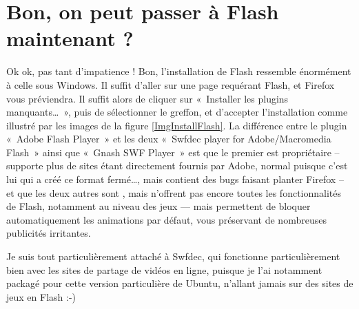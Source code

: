 \section{Bon, on peut passer à Flash maintenant ?}
Ok ok, pas tant d'impatience ! Bon, l'installation de Flash ressemble énormément à celle sous Windows. Il suffit d'aller sur une page requérant Flash, et Firefox vous préviendra. Il suffit alors de cliquer sur «~Installer les plugins manquants\ldots{}~», puis de sélectionner le greffon, et d'accepter l'installation comme illustré par les images de la figure \ref{ImgInstallFlash}. La différence entre le plugin «~Adobe Flash Player~» et les deux «~Swfdec player for Adobe/Macromedia Flash~» ainsi que «~Gnash SWF Player~» est que le premier est propriétaire -- supporte plus de sites étant directement fournis par Adobe, normal puisque c'est lui qui a créé ce format fermé\ldots{}, mais contient des bugs faisant planter Firefox -- et que les deux autres sont , mais n'offrent pas encore toutes les fonctionnalités de Flash, notamment au niveau des jeux --- mais permettent de bloquer automatiquement les animations par défaut, vous préservant de nombreuses publicités irritantes.\par
\InstallationFlash
\begin{nota}
Je suis tout particulièrement attaché à Swfdec, qui fonctionne particulièrement bien avec les sites de partage de vidéos en ligne, puisque je l'ai notamment packagé pour cette version particulière de Ubuntu, n'allant jamais sur des sites de jeux en Flash :-)
\end{nota}
